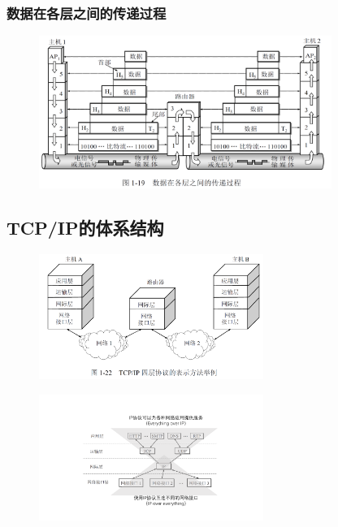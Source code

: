 \documentclass[cs4size,a4paper,10pt]{ctexart}
\begin{document}
	\subsubsection{数据在各层之间的传递过程}
	\begin{figure}[H]
		\centering
		\includegraphics[width=0.85\textwidth]{img/1.19}
	\end{figure}

	\subsection{TCP/IP的体系结构}
	\begin{figure}[H]
		\centering
		\includegraphics[width=0.65\textwidth]{img/1.22}
	\end{figure}

	\begin{figure}[H]
		\centering
		\includegraphics[width=0.65\textwidth]{img/1.24}
	\end{figure}
\end{document}
